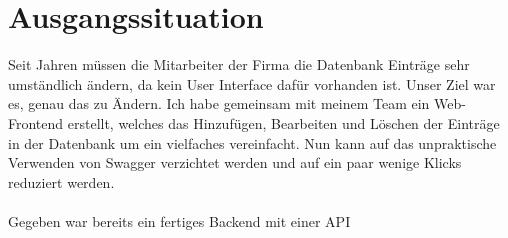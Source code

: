 

\section{Ausgangssituation}
\label{sec: initial_situation}
Seit Jahren müssen die Mitarbeiter der Firma die Datenbank
Einträge sehr umständlich ändern, da kein User Interface dafür 
vorhanden ist. Unser Ziel war es, genau das zu Ändern. Ich habe gemeinsam
mit meinem Team ein Web-Frontend erstellt, welches das Hinzufügen, Bearbeiten
und Löschen der Einträge in der Datenbank um ein vielfaches vereinfacht.
Nun kann auf das unpraktische Verwenden von Swagger verzichtet werden und auf ein paar 
wenige Klicks reduziert werden. 
\\
\\
Gegeben war bereits ein fertiges Backend mit einer API

\clearpage  

